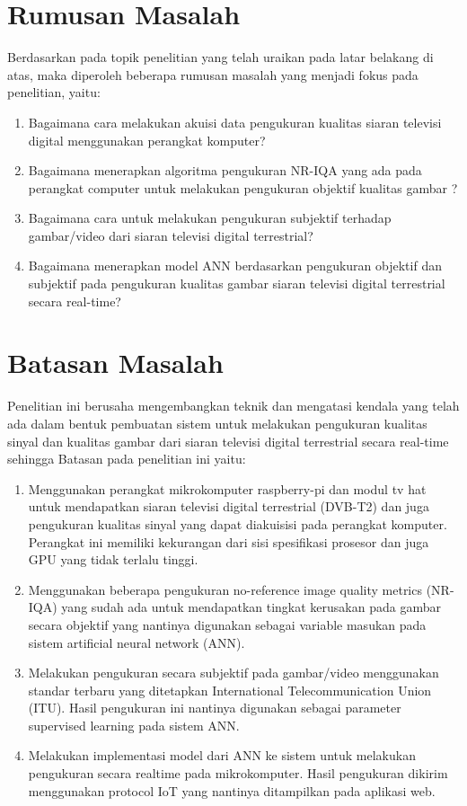 \section{Rumusan Masalah}
\label{sec:2-Rumusanmasalah}
\hspace{1,2cm}Berdasarkan pada topik penelitian yang telah uraikan pada latar belakang di atas, maka diperoleh beberapa rumusan masalah yang menjadi fokus pada penelitian, yaitu:
\begin{enumerate}
 \item Bagaimana cara melakukan akuisi data pengukuran kualitas siaran televisi digital menggunakan perangkat komputer?
 \item Bagaimana menerapkan algoritma pengukuran NR-IQA yang ada pada perangkat computer untuk melakukan pengukuran objektif kualitas gambar ?
 \item Bagaimana cara untuk melakukan pengukuran subjektif terhadap gambar/video dari siaran televisi digital terrestrial? 
 \item Bagaimana menerapkan model ANN berdasarkan pengukuran objektif dan subjektif pada pengukuran kualitas gambar siaran televisi digital terrestrial secara real-time?   
\end{enumerate}

\section{Batasan Masalah}
\label{sec:3-BatasanMasalah}
\hspace{1,2cm}Penelitian ini berusaha mengembangkan teknik dan mengatasi kendala yang telah ada dalam bentuk pembuatan sistem untuk melakukan pengukuran kualitas sinyal dan kualitas gambar dari siaran televisi digital terrestrial secara real-time sehingga Batasan pada penelitian ini yaitu:
\begin{enumerate}
	\item Menggunakan perangkat mikrokomputer raspberry-pi dan modul tv hat untuk mendapatkan siaran televisi digital terrestrial (DVB-T2) dan juga pengukuran kualitas sinyal yang dapat diakuisisi pada perangkat komputer. Perangkat ini memiliki kekurangan dari sisi spesifikasi prosesor dan juga GPU yang tidak terlalu tinggi. 
	\item Menggunakan beberapa pengukuran no-reference image quality metrics (NR-IQA) yang sudah ada untuk mendapatkan tingkat kerusakan pada gambar secara objektif yang nantinya digunakan sebagai variable masukan pada sistem artificial neural network (ANN).
	\item Melakukan pengukuran secara subjektif pada gambar/video menggunakan standar terbaru yang ditetapkan International Telecommunication Union (ITU). Hasil pengukuran ini nantinya digunakan sebagai parameter supervised learning pada sistem ANN.
	\item Melakukan implementasi model dari ANN ke sistem untuk melakukan pengukuran secara realtime pada mikrokomputer. Hasil pengukuran dikirim menggunakan protocol IoT yang nantinya ditampilkan pada aplikasi web.
\end{enumerate}

